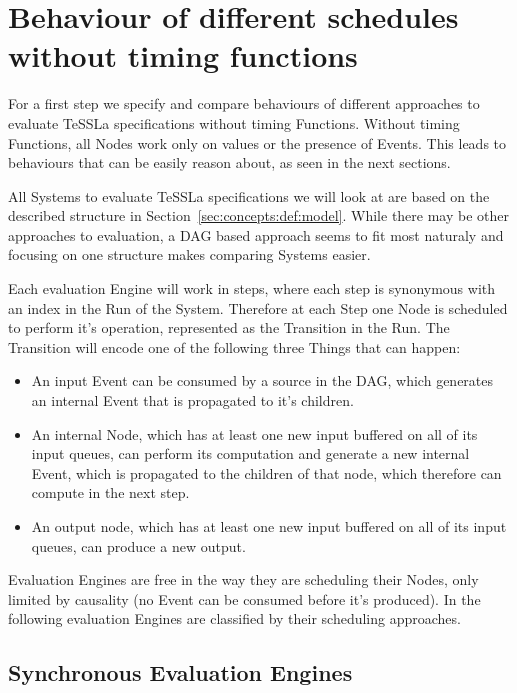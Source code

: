 \section{Behaviour of different schedules without timing functions}
\label{sec:concepts:behaviour_without_timing}

For a first step we specify and compare behaviours of different approaches to evaluate TeSSLa specifications without timing Functions.
Without timing Functions, all Nodes work only on values or the presence of Events.
This leads to behaviours that can be easily reason about, as seen in the next sections.

All Systems to evaluate TeSSLa specifications we will look at are based on the described structure in Section~\ref{sec:concepts:def:model}.
While there may be other approaches to evaluation, a DAG based approach seems to fit most naturaly and focusing on one structure makes comparing Systems easier.

Each evaluation Engine will work in steps, where each step is synonymous with an index in the Run of the System.
Therefore at each Step one Node is scheduled to perform it's operation, represented as the Transition in the Run.
The Transition will encode one of the following three Things that can happen:

\begin{itemize}
  \item An input Event can be consumed by a source in the DAG, which generates an internal Event that is propagated to it's children.
  \item An internal Node, which has at least one new input buffered on all of its input queues, can perform
    its computation and generate a new internal Event, which is propagated to the children of that node, which therefore can compute in the next step.
  \item An output node, which has at least one new input buffered on all of its input queues, can produce a new output.
\end{itemize}

Evaluation Engines are free in the way they are scheduling their Nodes, only limited by causality (no Event can be consumed before it's produced).
In the following evaluation Engines are classified by their scheduling approaches.

\subsection{Synchronous Evaluation Engines}
\label{sec:concepts:behaviour_without_timing:synchronous}

